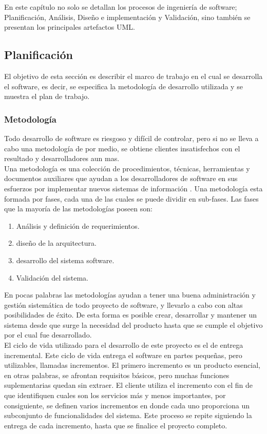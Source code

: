 En este capítulo no solo se detallan los  procesos de ingeniería de software; Planificación, Análisis, Diseño e implementación y Validación, sino también se presentan los principales 	artefactos UML.

 
\subsection{Planificación}
	
	El objetivo de esta sección es describir el marco de trabajo en el cual se desarrolla el software, es decir,  se especifica la metodología de desarrollo utilizada y se muestra el plan de trabajo.
	
	
	\subsubsection{Metodología}
	Todo desarrollo de software es riesgoso y difícil de controlar, pero si no se lleva a cabo una metodología de por medio, se obtiene clientes insatisfechos con el resultado y desarrolladores aun mas. 
	\\

	
	
	Una metodología es una colección de procedimientos, técnicas, herramientas y documentos auxiliares que ayudan a los desarrolladores de software en sus esfuerzos por implementar nuevos sistemas de información \cite{GOM10}. Una metodología esta formada por fases, cada	una de las cuales se puede dividir en sub-fases. Las fases que la mayoría de las metodologías poseen son:
	\begin{enumerate}
		\item Análisis y definición de requerimientos.
		\item diseño de la arquitectura.
		\item desarrollo del sistema software.
		\item Validación del sistema.
	\end{enumerate}
	
	
	En pocas palabras las metodologías ayudan a tener una buena administración y gestión sistemática de todo proyecto de software, y llevarlo a cabo con altas posibilidades de éxito. De esta forma es posible crear, desarrollar y mantener un sistema desde que surge la necesidad del producto hasta que se cumple el objetivo por el cual fue desarrollado.
	\\

	El ciclo de vida utilizado para el desarrollo de este proyecto es el de entrega incremental. Este ciclo de vida entrega el software en partes pequeñas, pero utilizables, llamadas incrementos. El primero incremento es un producto esencial, en otras palabras, se afrontan requisitos básicos, pero muchas funciones suplementarias quedan sin extraer. El cliente utiliza el incremento con el fin de que identifiquen cuales son los servicios más y menos importantes, por consiguiente, se definen varios incrementos en donde cada uno proporciona un subconjunto de funcionalidades del sistema. Este proceso se repite siguiendo la entrega de cada incremento, hasta que se finalice el proyecto completo.
	

